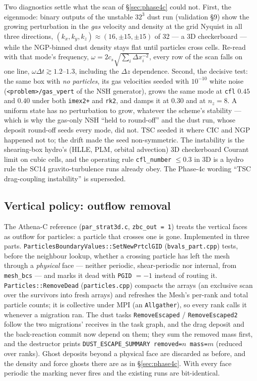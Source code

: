 \documentclass[11pt]{article}
\newcommand{\code}[1]{\texttt{#1}}
\newcommand{\file}[1]{\texttt{\small #1}}
\newcommand{\fn}[1]{\texttt{\small #1}}
\begin{document}
Two diagnostics settle what the scan of \S\ref{sec:phase4c} could not. First, the
eigenmode: binary outputs of the unstable $32^3$ dust run (validation \S9) show the
growing perturbation in the \emph{gas} velocity and density at the grid Nyquist in all
three directions, $(k_x,k_y,k_z) \approx (16,\pm15,\pm15)$ of 32 --- a 3D checkerboard
--- while the NGP-binned dust density stays flat until particles cross cells. Re-read
with that mode's frequency, $\omega = 2c_s\sqrt{\sum_i \Delta x_i^{-2}}$, every row of
the scan falls on one line, $\omega\Delta t \gtrsim 1.2$--$1.3$, including the
$\Delta z$ dependence. Second, the decisive test: the same box with \emph{no particles},
its gas velocities seeded with $10^{-10}$ white noise (\code{<problem>/gas\_vpert} of the
NSH generator), grows the same mode at \code{cfl} $0.45$ and $0.40$ under both
\code{imex2+} and \code{rk2}, and damps it at $0.30$ and at $n_z = 8$. A uniform state
has no perturbation to grow, whatever the scheme's stability --- which is why the
gas-only NSH ``held to round-off'' and the dust run, whose deposit round-off seeds every
mode, did not. TSC seeded it where CIC and NGP happened not to; the drift made the seed
non-symmetric. The instability is the shearing-box hydro's (HLLE, PLM, orbital
advection) 3D checkerboard Courant limit on cubic cells, and the operating rule
\code{cfl\_number} $\le 0.3$ in 3D is a hydro rule the SC14 gravito-turbulence runs
already obey. The Phase-4c wording ``TSC drag-coupling instability'' is superseded.

\subsection{Vertical policy: outflow removal}

The Athena-C reference (\file{par\_strat3d.c}, \code{zbc\_out = 1}) treats the vertical
faces as outflow for particles: a particle that crosses one is gone. Implemented in
three parts. \fn{ParticlesBoundaryValues::SetNewPrtclGID} (\file{bvals\_part.cpp})
tests, before the neighbour lookup, whether a crossing particle has left the mesh
through a \emph{physical} face --- neither periodic, shear-periodic nor internal, from
\code{mesh\_bcs} --- and marks it dead with \code{PGID} $= -1$ instead of routing it.
\fn{Particles::RemoveDead} (\file{particles.cpp}) compacts the arrays (an exclusive scan
over the survivors into fresh arrays) and refreshes the Mesh's per-rank and total
particle counts; it is collective under MPI (an \code{Allgather}), so every rank calls
it whenever a migration ran. The dust tasks \fn{RemoveEscaped} / \fn{RemoveEscaped2}
follow the two migrations' receives in the task graph, and the drag deposit and the
back-reaction commit now depend on them; they sum the removed mass first, and the
destructor prints \code{DUST\_ESCAPE\_SUMMARY removed=$n$ mass=$m$} (reduced over
ranks). Ghost deposits beyond a physical face are discarded as before, and the density
and force ghosts there are as in \S\ref{sec:phase4c}. With every face periodic the
marking never fires and the existing runs are bit-identical.
\end{document}
